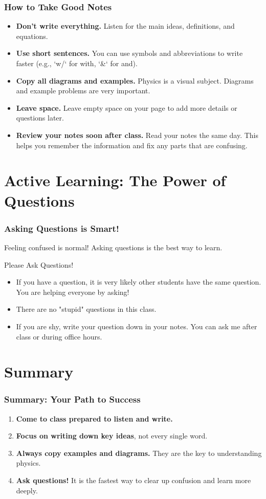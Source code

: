 \documentclass{beamer}
\begin{document}
\begin{frame}
\frametitle{How to Take Good Notes}
\begin{itemize}
    \item \textbf{Don't write everything.} Listen for the main ideas, definitions, and equations.
    \pause
    \item \textbf{Use short sentences.} You can use symbols and abbreviations to write faster (e.g., `w/` for with, `\&` for and).
    \pause
    \item \textbf{Copy all diagrams and examples.} Physics is a visual subject. Diagrams and example problems are very important.
    \pause
    \item \textbf{Leave space.} Leave empty space on your page to add more details or questions later.
    \pause
    \item \textbf{Review your notes soon after class.} Read your notes the same day. This helps you remember the information and fix any parts that are confusing.
\end{itemize}
\end{frame}

\section{Active Learning: The Power of Questions}

\begin{frame}
\frametitle{Asking Questions is Smart!}
Feeling confused is normal! Asking questions is the best way to learn.

\begin{block}{Please Ask Questions!}
\begin{itemize}
    \item If you have a question, it is very likely other students have the same question. You are helping everyone by asking!
    \pause
    \item There are no "stupid" questions in this class.
    \pause
    \item If you are shy, write your question down in your notes. You can ask me after class or during office hours.
\end{itemize}
\end{block}
\vfill
\end{frame}

\section{Summary}

\begin{frame}
\frametitle{Summary: Your Path to Success}
\begin{enumerate}
    \item \textbf{Come to class prepared to listen and write.}
    \item \textbf{Focus on writing down key ideas}, not every single word.
    \item \textbf{Always copy examples and diagrams.} They are the key to understanding physics.
    \item \textbf{Ask questions!} It is the fastest way to clear up confusion and learn more deeply.
\end{enumerate}
\end{frame}
\end{document}
